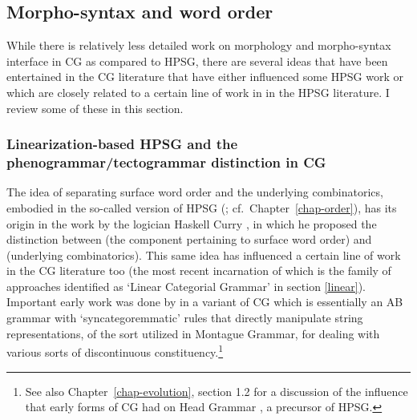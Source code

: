 \documentclass[output=paper]{langsci/langscibook}
\begin{document}




\subsection{Morpho-syntax and word order \label{sec:morphology}}

While there is relatively less detailed work on morphology and
morpho-syntax interface in CG as compared to HPSG, there are several
ideas that have been entertained in the CG literature that have either
influenced some HPSG work or which are closely related to a certain
line of work in in the HPSG literature. I review some of these 
in this section.


\subsubsection{Linearization-based HPSG and the phenogrammar/tectogrammar distinction in CG }

The idea of separating surface word order and the underlying
combinatorics, embodied in the so-called 
version of HPSG (\citealt{Reape94a,Kathol2000a}; cf.\ Chapter~\ref{chap-order}), has its origin
in the work by the logician Haskell Curry \citep{curry61}, in which he
proposed the distinction between  (the component
pertaining to surface word order) and  (underlying
combinatorics). This same idea has influenced a certain line of work
in the CG literature too (the most recent incarnation of which is the family of
approaches identified as `Linear Categorial Grammar' in section \ref{linear}). Important early work was done by
\citet{Dowty82a-u,Dowty90a-Eng} in a variant of CG which is essentially an
AB grammar with `syncategoremmatic' rules that directly manipulate
string representations, of the sort utilized in Montague Grammar, for
dealing with various sorts of discontinuous constituency.\footnote{See
also Chapter~\ref{chap-evolution}, section 1.2 for a discussion of the influence
that early forms of CG \citep{Bach79a,Bach80a,Dowty82a-u,Dowty82b} had
on Head Grammar \citep{Pollard84a-u}, a precursor of HPSG.}
\end{document}
